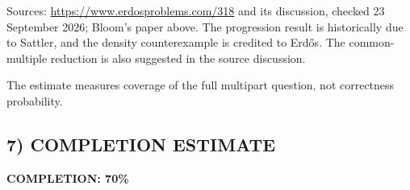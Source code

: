 Sources: \url{https://www.erdosproblems.com/318} and its discussion, checked 23 September 2026; Bloom's paper above. The progression result is historically due to Sattler, and the density counterexample is credited to Erd\H{o}s. The common-multiple reduction is also suggested in the source discussion.

The estimate measures coverage of the full multipart question, not correctness probability.
\subsection*{7) COMPLETION ESTIMATE}
\textbf{COMPLETION: 70\%}

